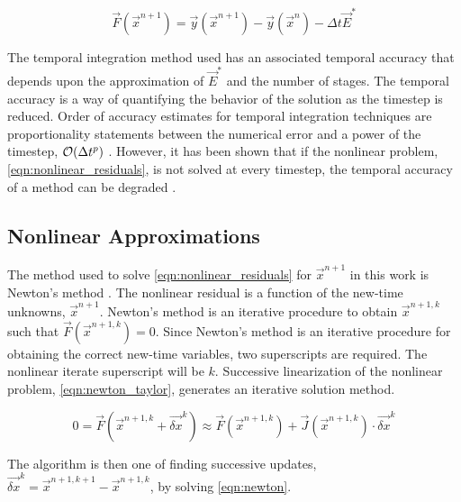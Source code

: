 \begin{equation}
\label{eqn:nonlinear_residuals}
\vec{F}(\vec{x}^{n+1}) = \vec{y}(\vec{x}^{n+1}) - \vec{y}(\vec{x}^n) -\Delta t \vec{E}^{*}
\end{equation}

The temporal integration method used has an associated temporal accuracy that depends upon the approximation of $\vec{E}^{*}$ and the number of stages. 
The temporal accuracy is a way of quantifying the behavior of the solution as the timestep is reduced.
Order of accuracy estimates for temporal integration techniques are proportionality statements between the numerical error and a power of the timestep, $\mathcal{O}(\dt{}^{p})$ \cite{LeVeque2007}. 
However, it has been shown that if the nonlinear problem, \eqref{eqn:nonlinear_residuals}, is not solved at every timestep, the temporal accuracy of a method can be degraded \cite{Knoll2001, Mahaffy1993}.

\subsection{Nonlinear Approximations}
\label{subsect:nonlinear_approximations}

The method used to solve \eqref{eqn:nonlinear_residuals} for $\vec{x}^{n+1}$ in this work is Newton's method \cite{Deuflhard2004, Dennis1996}.
The nonlinear residual is a function of the new-time unknowns, $\vec{x}^{n+1}$.
Newton's method is an iterative procedure to obtain $\vec{x}^{n+1,k}$ such that $\vec{F}(\vec{x}^{n+1,k}) = 0$.
Since Newton's method is an iterative procedure for obtaining the correct new-time variables, two superscripts are required.
The nonlinear iterate superscript will be $k$.
Successive linearization of the nonlinear problem, \eqref{eqn:newton_taylor}, generates an iterative solution method.

\begin{equation}
\label{eqn:newton_taylor}
0 = \vec{F}(\vec{x}^{n+1,k}+\vec{\delta x}^k) \approx \vec{F}(\vec{x}^{n+1,k}) + \vec{J}(\vec{x}^{n+1,k}) \cdot \vec{\delta x}^k
\end{equation}

The algorithm is then one of finding successive updates, $\vec{\delta x}^k = \vec{x}^{n+1,k+1} - \vec{x}^{n+1,k}$, by solving \eqref{eqn:newton}.

